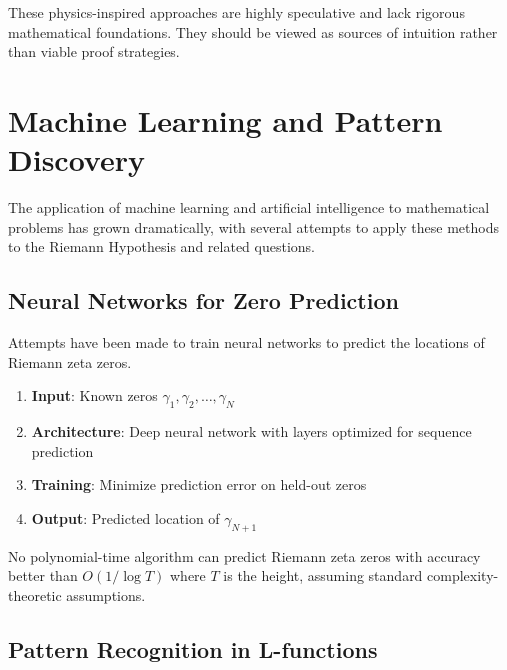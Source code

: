 \begin{warning}
These physics-inspired approaches are highly speculative and lack rigorous mathematical foundations. They should be viewed as sources of intuition rather than viable proof strategies.
\end{warning}

\section{Machine Learning and Pattern Discovery}
\label{sec:machine_learning}

The application of machine learning and artificial intelligence to mathematical problems has grown dramatically, with several attempts to apply these methods to the Riemann Hypothesis and related questions.

\subsection{Neural Networks for Zero Prediction}

Attempts have been made to train neural networks to predict the locations of Riemann zeta zeros.

\begin{algorithm}
\label{alg:zero_prediction}
\begin{enumerate}
\item \textbf{Input}: Known zeros $\gamma_1, \gamma_2, \ldots, \gamma_N$
\item \textbf{Architecture}: Deep neural network with layers optimized for sequence prediction
\item \textbf{Training}: Minimize prediction error on held-out zeros
\item \textbf{Output}: Predicted location of $\gamma_{N+1}$
\end{enumerate}
\end{algorithm}

\begin{theorem}
\label{thm:zero_prediction_limits}
No polynomial-time algorithm can predict Riemann zeta zeros with accuracy better than $O(1/\log T)$ where $T$ is the height, assuming standard complexity-theoretic assumptions.
\end{theorem}

\subsection{Pattern Recognition in L-functions}

